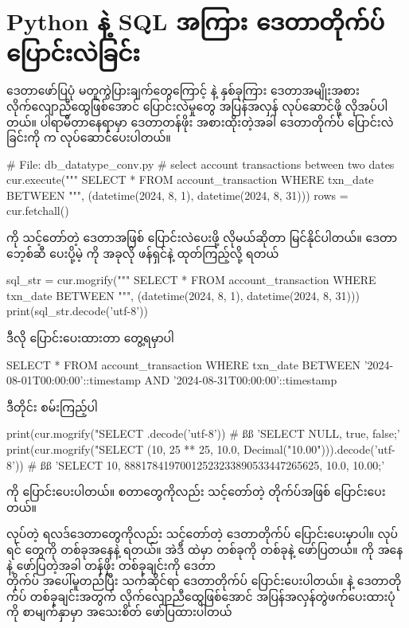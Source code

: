 \section{Python နဲ့ SQL အကြား ဒေတာတိုက်ပ် ပြောင်းလဲခြင်း}
ဒေတာဖော်ပြပုံ မတူကွဲပြားချက်တွေကြောင့်  နဲ့   နှစ်ခုကြား ဒေတာအမျိုးအစား လိုက်လျောညီထွေဖြစ်အောင် ပြောင်းလဲမှုတွေ အပြန်အလှန် လုပ်ဆောင်ဖို့ လိုအပ်ပါတယ်။  ပါရာမီတာနေရာမှာ  ဒေတာတန်ဖိုး အစားထိုးတဲ့အခါ ဒေတာတိုက်ပ် ပြောင်းလဲခြင်းကို  က လုပ်ဆောင်ပေးပါတယ်။ %
%
\begin{py}
# File: db_datatype_conv.py
# select account transactions between two dates
cur.execute("""
    SELECT * FROM account_transaction 
        WHERE txn_date BETWEEN %
""", (datetime(2024, 8, 1), datetime(2024, 8, 31)))
rows = cur.fetchall()
\end{py}
% 
  ကို သင့်တော်တဲ့  ဒေတာအဖြစ် ပြောင်းလဲပေးဖို့ လိုမယ်ဆိုတာ မြင်နိုင်ပါတယ်။ ဒေတာဘေ့စ်ဆီ ပေးပို့မဲ့  ကို အခုလို  ဖန်ရှင်နဲ့ ထုတ်ကြည့်လို့ ရတယ်
%
\begin{py}
sql_str = cur.mogrify("""
    SELECT * FROM account_transaction 
        WHERE txn_date BETWEEN %
""", (datetime(2024, 8, 1), datetime(2024, 8, 31)))
print(sql_str.decode('utf-8'))
\end{py}
%
ဒီလို ပြောင်းပေးထားတာ တွေ့ရမှာပါ 
%
\begin{codetxt}
SELECT * FROM account_transaction 
    WHERE txn_date BETWEEN '2024-08-01T00:00:00'::timestamp 
        AND '2024-08-31T00:00:00'::timestamp
\end{codetxt}
%
ဒီတိုင်း စမ်းကြည့်ပါ  
%
\begin{py}
print(cur.mogrify("SELECT %
         .decode('utf-8'))
# ßß 'SELECT NULL, true, false;'
print(cur.mogrify("SELECT %
                  (10, 25 ** 25, 10.0, Decimal("10.00"))).decode('utf-8'))
# ßß 'SELECT 10, 88817841970012523233890533447265625, 10.0, 10.00;'
\end{py}
%
 ကို  ပြောင်းပေးပါတယ်။ \fEn{,} \fEn{,} \fEn{,}  စတာတွေကိုလည်း သင့်တော်တဲ့  တိုက်ပ်အဖြစ် ပြောင်းပေးတယ်။ 

 လုပ်တဲ့ ရလဒ်ဒေတာတွေကိုလည်း သင့်တော်တဲ့  ဒေတာတိုက်ပ် ပြောင်းပေးမှာပါ။  လုပ်ရင်  တွေကို  တစ်ခုအနေနဲ့ ရတယ်။ အဲဒီ  ထဲမှာ  တစ်ခုကို  တစ်ခုနဲ့ ဖော်ပြတယ်။  ကို  အနေနဲ့ ဖော်ပြတဲ့အခါ  တန်ဖိုး တစ်ခုချင်းကို  ဒေတာ\\တိုက်ပ် အပေါ်မူတည်ပြီး သက်ဆိုင်ရာ  ဒေတာတိုက်ပ် ပြောင်းပေးပါတယ်။  နဲ့  ဒေတာတိုက်ပ် တစ်ခုချင်းအတွက် လိုက်လျောညီထွေဖြစ်အောင် အပြန်အလှန်တွဲဖက်ပေးထားပုံကို  စာမျက်နှာမှာ အသေးစိတ် ဖော်ပြထားပါတယ် 


